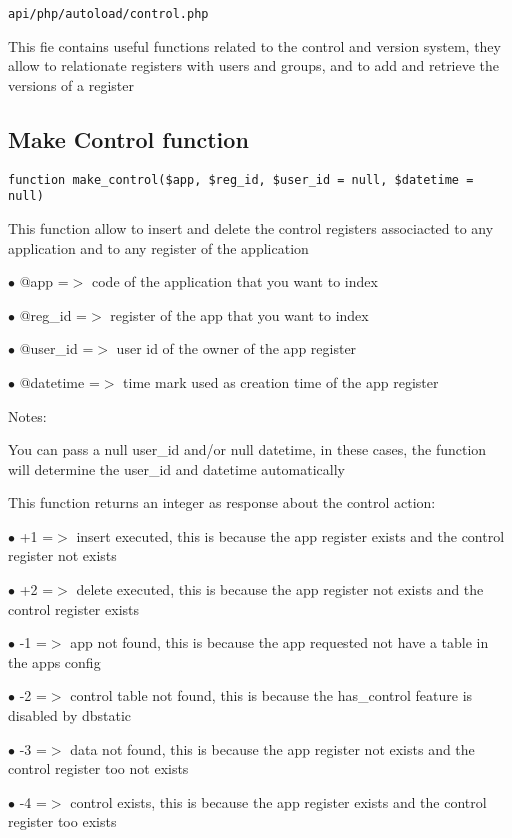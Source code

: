 \documentclass[a4paper]{book}
\begin{document}
\begin{lstlisting}
api/php/autoload/control.php
\end{lstlisting}

This fie contains useful functions related to the control and version system, they allow to
relationate registers with users and groups, and to add and retrieve the versions of a register

\hypertarget{toc58}{}
\subsection{Make Control function}

\begin{lstlisting}
function make_control($app, $reg_id, $user_id = null, $datetime = null)
\end{lstlisting}

This function allow to insert and delete the control registers associacted
to any application and to any register of the application

\begin{compactitem}
\item[\color{myblue}$\bullet$] @app      =$>$ code of the application that you want to index
\item[\color{myblue}$\bullet$] @reg\_id   =$>$ register of the app that you want to index
\item[\color{myblue}$\bullet$] @user\_id  =$>$ user id of the owner of the app register
\item[\color{myblue}$\bullet$] @datetime =$>$ time mark used as creation time of the app register
\end{compactitem}

Notes:

You can pass a null user\_id and/or null datetime, in these cases, the
function will determine the user\_id and datetime automatically

This function returns an integer as response about the control action:

\begin{compactitem}
\item[\color{myblue}$\bullet$] +1 =$>$ insert executed, this is because the app register exists and the control register not exists
\item[\color{myblue}$\bullet$] +2 =$>$ delete executed, this is because the app register not exists and the control register exists
\item[\color{myblue}$\bullet$] -1 =$>$ app not found, this is because the app requested not have a table in the apps config
\item[\color{myblue}$\bullet$] -2 =$>$ control table not found, this is because the has\_control feature is disabled by dbstatic
\item[\color{myblue}$\bullet$] -3 =$>$ data not found, this is because the app register not exists and the control register too not exists
\item[\color{myblue}$\bullet$] -4 =$>$ control exists, this is because the app register exists and the control register too exists
\end{compactitem}
\end{document}
